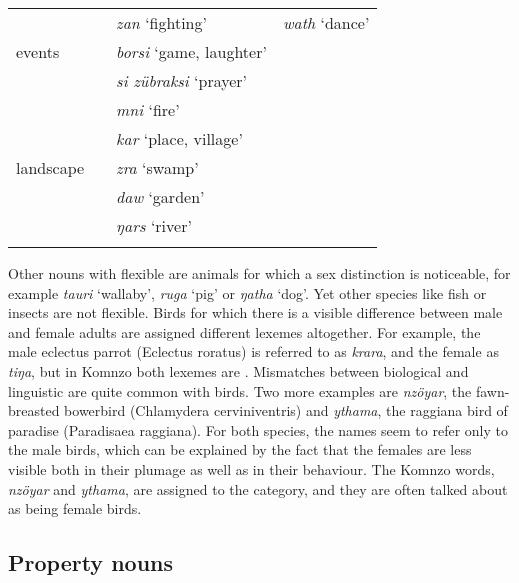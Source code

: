 {\begin{table}
\begin{tabular}	{p{2cm}lp{}p{}}
		\multirow{3}{1,8cm}{events}&\multirow{3}{*}{\F}&\emph{zan} `fighting'&\emph{wath} `dance'\\
		&&\emph{borsi} `game, laughter'&\\
		&&\emph{si zübraksi} `prayer'&\\\midrule
		\multirow{5}{1,8cm}{landscape}&\multirow{5}{*}{\F}&\emph{mni} `fire'&\\
		&&\emph{kar} `place, village'&\\
		&&\emph{zra} `swamp'&\\
		&&\emph{daw} `garden'&\\
		&&\emph{ŋars} `river'&\\
		\lspbottomrule
	\end{tabular}
\end{table}}

Other nouns with flexible  are animals for which a sex distinction is noticeable, for example \emph{tauri} `wallaby', \emph{ruga} `pig' or \emph{ŋatha} `dog'. Yet other species like fish or insects are not flexible. Birds for which there is a visible difference between male and female adults are assigned different lexemes altogether. For example, the male eclectus parrot (Eclectus roratus) is referred to as \emph{krara}, and the female as \emph{tiŋa}, but in Komnzo both lexemes are . Mismatches between biological  and linguistic  are quite common with birds. Two more examples are \emph{nzöyar}, the fawn-breasted bowerbird (Chlamydera cerviniventris) and \emph{ythama}, the raggiana bird of paradise (Paradisaea raggiana). For both species, the names seem to refer only to the male birds, which can be explained by the fact that the females are less visible both in their plumage as well as in their behaviour. The Komnzo words, \emph{nzöyar} and \emph{ythama}, are assigned to the  category, and they are often talked about as being female birds.

\subsection{Property nouns} \label{propertynouns}

